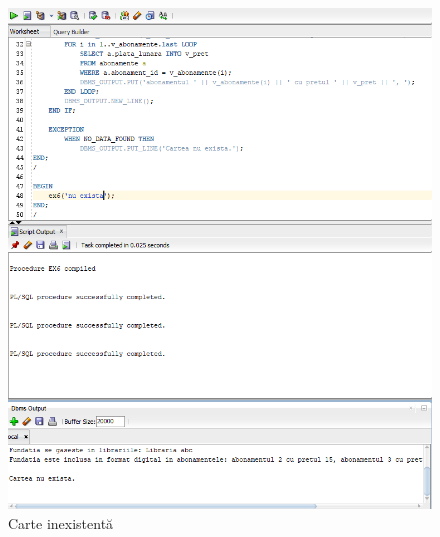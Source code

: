 \documentclass[12pt]{article}
\begin{document}
\begin{figure}[!htb]
\includegraphics[max width=\linewidth]{imgs/ex6_3.png}
\caption{Carte inexistentă}
\label{fig:ex6_3}
\end{figure}
\end{document}
